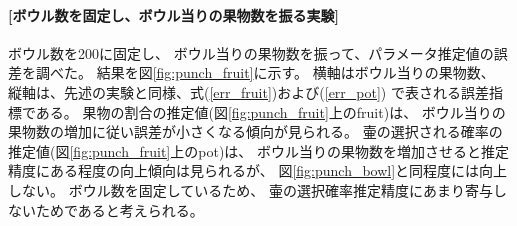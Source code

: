 \documentclass[a4j]{jarticle}
\begin{document}
\paragraph{[ボウル数を固定し、ボウル当りの果物数を振る実験]}
ボウル数を200に固定し、
ボウル当りの果物数を振って、パラメータ推定値の誤差を調べた。
結果を図\ref{fig:punch_fruit}に示す。
横軸はボウル当りの果物数、
縦軸は、先述の実験と同様、式(\ref{err_fruit})および(\ref{err_pot})
で表される誤差指標である。
果物の割合の推定値(図\ref{fig:punch_fruit}上のfruit)は、
ボウル当りの果物数の増加に従い誤差が小さくなる傾向が見られる。
壷の選択される確率の推定値(図\ref{fig:punch_fruit}上のpot)は、
ボウル当りの果物数を増加させると推定精度にある程度の向上傾向は見られるが、
図\ref{fig:punch_bowl}と同程度には向上しない。
ボウル数を固定しているため、
壷の選択確率推定精度にあまり寄与しないためであると考えられる。
\end{document}
